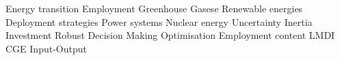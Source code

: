 \noindent Energy transition \quad 
Employment \quad
Greenhouse Gasese \quad
Renewable energies \quad
Deployment strategies \quad
Power systems \quad
Nuclear energy \quad
Uncertainty \quad
Inertia \quad
Investment \quad
Robust Decision Making \quad
Optimisation \quad
Employment content \quad
LMDI \quad
CGE \quad
Input-Output \quad